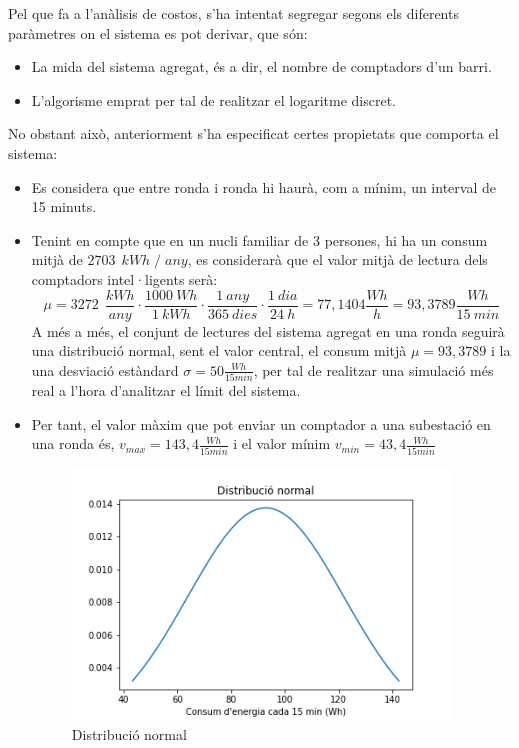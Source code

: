 
Pel que fa a l'anàlisis de costos, s'ha intentat segregar segons els diferents paràmetres on el sistema es pot derivar, que són:
\begin{itemize}
	\item La mida del sistema agregat, és a dir, el nombre de comptadors d'un barri.
	\item L'algorisme emprat per tal de realitzar el logaritme discret.
\end{itemize}
No obstant això, anteriorment s'ha especificat certes propietats que comporta el sistema:
\begin{itemize}
	\item Es considera que entre ronda i ronda hi haurà, com a mínim, un interval de 15 minuts.
\item Tenint en compte que en un nucli familiar de 3 persones, hi ha un consum mitjà de $2703 \ \ kWh \; / \; any$, es considerarà que el valor mitjà de lectura dels comptadors intel·ligents serà:
\[\mu = 3272 \ \ \frac{kWh}{any} \cdot \frac{1000 \ Wh}{1 \ kWh} \cdot \frac{1 \ any}{365 \ dies} \cdot \frac{1 \ dia}{24 \ h} = 77,1404\frac{Wh}{h} = 93,3789 \frac{Wh}{15 \ min} \]
A més a més, el conjunt de lectures del sistema agregat en una ronda seguirà una distribució normal, sent el valor central, el consum mitjà $\mu = 93,3789$ i la una desviació estàndard $\sigma = 50 \frac{Wh}{15 min}$, per tal de realitzar una simulació més real a l'hora d'analitzar el límit del sistema.

\item Per tant, el valor màxim que pot enviar un comptador a una subestació en una ronda és, $v_{max} = 143,4 \frac{Wh}{15 min}$ i el valor mínim $v_{min} =  43,4 \frac{Wh}{15 min}$
\begin{figure}[H]
	\centering
	\includegraphics[width=10cm]{imgs/cost/normal.png}
	\caption{Distribució normal}
	\label{fig:normal-dist}
\end{figure}
\end{itemize}
